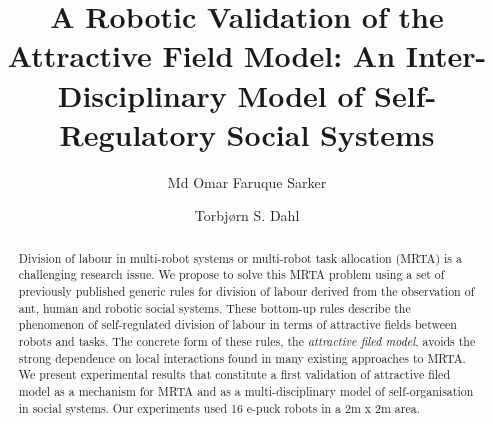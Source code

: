 \documentclass{llncs}
\begin{document}
\title{A Robotic Validation of the Attractive Field Model: An Inter-Disciplinary Model of Self-Regulatory Social Systems}
\author{Md Omar Faruque Sarker \and
Torbj{\o}rn S. Dahl %
}
\maketitle
\begin{abstract}
Division of labour in multi-robot systems or multi-robot task allocation (MRTA) is a challenging research issue.
We propose to solve this MRTA problem using a set of previously published generic rules for division of labour derived from the observation of ant, human and robotic social systems.
These bottom-up rules describe the phenomenon of self-regulated division of labour in terms of attractive fields between robots and tasks.
The concrete form of these rules, the \textit{attractive filed model}, avoids the strong dependence on local interactions found in many existing approaches to MRTA.
We present experimental results that constitute a first validation of attractive filed model as a mechanism for MRTA and as a multi-disciplinary model of self-organisation in social systems.
Our experiments used 16 e-puck robots in a 2m x 2m area.
\end{abstract}
\end{document}
